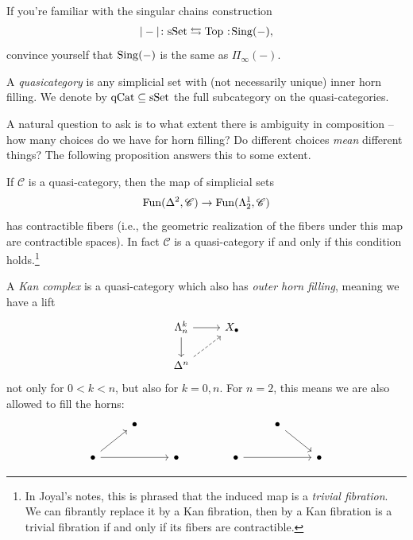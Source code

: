 \documentclass[11pt,openany]{book}
\begin{document}
\begin{exercise} If you're familiar with the singular chains construction
\begin{align*}
    |-| \colon \sSet \leftrightarrows \Top \noloc \Sing(-),
\end{align*}
convince yourself that $\mathrm{Sing}(-)$ is the same as $\Pi_\infty(-)$.
\end{exercise}


\begin{definition} A \textit{quasicategory} is any simplicial set with (not necessarily unique) inner horn filling. We denote by $\mathrm{qCat} \subseteq \mathrm{sSet}$ the full subcategory on the quasi-categories.
\end{definition}

A natural question to ask is to what extent there is ambiguity in composition -- how many choices do we have for horn filling? Do different choices \textit{mean} different things? The following proposition answers this to some extent.

\begin{proposition} If $\mathscr{C}$ is a quasi-category, then the map of simplicial sets
\begin{align*}
    \mathrm{Fun}(\Delta^2,\mathscr{C})\to \mathrm{Fun}(\Lambda_2^1,\mathscr{C})
\end{align*}
has contractible fibers (i.e., the geometric realization of the fibers under this map are contractible spaces). In fact $\mathscr{C}$ is a quasi-category if and only if this condition holds.\footnote{In Joyal's notes, this is phrased that the induced map is a \textit{trivial fibration}. We can fibrantly replace it by a Kan fibration, then by \cite[12.18]{Joyal-qcats} a Kan fibration is a trivial fibration if and only if its fibers are contractible.}
\end{proposition}





\begin{definition} A \textit{Kan complex} is a quasi-category which also has \textit{outer horn filling}, meaning we have a lift
\[ \begin{tikzcd}
    \Lambda^k_n\rar\dar & X_\bullet\\
    \Delta^n\ar[ur,dashed] & 
\end{tikzcd} \]
not only for $0<k<n$, but also for $k=0,n$. For $n=2$, this means we are also allowed to fill the horns:
\[ \begin{tikzcd}
     & \bullet\\
    \bullet\ar[ur]\ar[rr] & & \bullet
\end{tikzcd} \quad\quad \quad\quad  \begin{tikzcd}
    & \bullet\ar[dr] & \\
    \bullet\ar[rr] & & \bullet
\end{tikzcd} \]
\end{definition}
\end{document}
